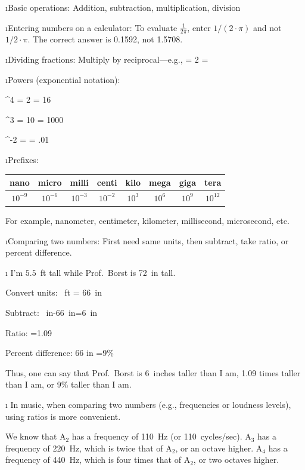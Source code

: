 \bi

\i Basic operations:
Addition, subtraction, multiplication, division

\i Entering numbers on a calculator:
To evaluate $\frac{1}{2\pi}$, enter 
$1/(2\cdot \pi)$ and not $1/2\cdot \pi$.
The correct answer is 0.1592, not 1.5708.

\i Dividing fractions: 
Multiply by reciprocal---e.g.,
%
\be
{}= 2\cdot {} = 
\ee

\i Powers (exponential notation):

^4 = 2 = 16
\ee

^3 = 10 = 1000
\ee

^{-2} =  = .01
\ee

\i Prefixes:

\begin{center}
\begin{tabular}{|c|c|c|c|c|c|c|c|}
\hline
nano & micro & milli & centi & kilo & mega & giga & tera \\
\hline
$10^{-9}$ & $10^{-6}$ & $10^{-3}$ & $10^{-2}$ & $10^3$ & $10^6$ & $10^{9}$ & $10^{12}$ \\
\hline
\end{tabular}
\end{center}
%
For example, nanometer, centimeter, kilometer, millisecond, microsecond, etc.

\i Comparing two numbers: 
First need same units, then subtract, take ratio, or 
percent difference.

\i 
\ex I'm $5.5$~ft tall while Prof.~Borst is 72~in tall.

Convert units:
%
~{\rm ft}\cdot{} 
= 66~{\rm in}
\ee

Subtract: 
\ {\rm in}-66\ {\rm in}=6\ {\rm in}
\ee

Ratio: 
\be
{}=1.09
\ee

Percent difference:
\be
{}
{66 {\rm in}}  
=9\%
\ee

Thus, one can say that Prof.~Borst is 6~inches taller 
than I am, 1.09 times taller than I am, or
9\% taller than I am.

\i 
In music, when comparing two numbers 
(e.g., frequencies or loudness levels),
using ratios is more convenient.

\ex We know that A$_2$ has a frequency
of 110~Hz (or 110~cycles/sec).
A$_3$ has a frequency of 220~Hz, 
which is twice that of A$_2$, or an octave higher.
A$_4$ has a frequency of 440~Hz, 
which is four times that of A$_2$, or two octaves higher.


